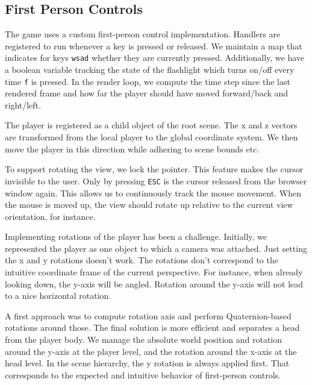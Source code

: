 \documentclass[11pt]{article}
\begin{document}
\subsection{First Person Controls}
\par The game uses a custom first-person control implementation. Handlers are registered to run whenever a key is pressed or released. We maintain a map that indicates for keys \texttt{wsad} whether they are currently pressed. Additionally, we have a boolean variable tracking the state of the flashlight which turns on/off every time \texttt{f} is pressed. In the render loop, we compute the time step since the last rendered frame and how far the player should have moved forward/back and right/left.
\par The player is registered as a child object of the root scene. The x and z vectors are transformed from the local player to the global coordinate system. We then move the player in this direction while adhering to scene bounds etc.
\par To support rotating the view, we lock the pointer. This feature makes the cursor invisible to the user. Only by pressing \texttt{ESC} is the cursor released from the browser window again. This allows us to continuously track the mouse movement. When the mouse is moved up, the view should rotate up relative to the current view orientation, for instance.
\par Implementing rotations of the player has been a challenge. Initially, we represented the player as one object to which a camera was attached. Just setting the x and y rotations doesn't work. The rotations don't correspond to the intuitive coordinate frame of the current perspective. For instance, when already looking down, the y-axis will be angled. Rotation around the y-axis will not lead to a nice horizontal rotation.
\par A first approach was to compute rotation axis and perform Quaternion-based rotations around those. The final solution is more efficient and separates a head from the player body. We manage the absolute world position and rotation around the y-axis at the player level, and the rotation around the x-axis at the head level. In the scene hierarchy, the y rotation is always applied first. That corresponds to the expected and intuitive behavior of first-person controls.
\end{document}
